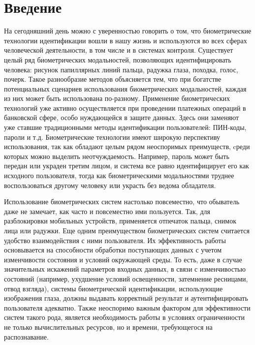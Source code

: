 \documentclass[12pt,a4paper]{article} %
\begin{document}
\newpage
\tableofcontents
 


\newpage
\section{Введение}

На сегодняшний день можно с уверенностью говорить о том, что биометрические технологии идентификации вошли в нашу жизнь и используются во всех сферах человеческой деятельности, в том числе и в системах контроля. Существует целый ряд биометрических модальностей, позволяющих идентифицировать человека: рисунок папиллярных линий пальца, радужка глаза, походка, голос, почерк. Такое разнообразие методов объясняется тем, что при богатстве потенциальных сценариев использования биометрических модальностей, каждая из них может быть использована по-разному. Применение биометрических технологий уже активно осуществляется при проведении платежных операций в банковской сфере, особо нуждающейся в защите данных. Здесь они заменяют уже ставшие традиционными методы идентификации пользователей: ПИН-коды, пароли и т.д. Биометрические технологии имеют широкую перспективу использования, так как обладают целым рядом неоспоримых преимуществ, cреди которых можно выделить неотчуждаемость. Например, пароль может быть передан или украден третим лицом, и система все равно идентифицирует его как исходного пользователя, тогда как биометрическими модальностями труднее воспользоваться другому человеку или украсть без ведома обладателя. 

Использование биометрических систем настолько повсеместно, что обыватель даже не замечает, как часто и повсеместно ими пользуется. Так, для разблокировки мобильных устройств, применяется отпечаток пальца, снимок лица или радужки. Еще одним преимуществом биометрических систем считается удобство взаимодействия с ними пользователя. Их эффективность работы основывается на способности обработки поступающих данных с учетом изменчивости состояния и условий окружающей среды. То есть, даже в случае значительных искажений параметров входных данных, в связи с изменчивостью состояний (например, ухудшение условий освещенности, затемнение ресницами, отвод взгляда), системы биометрической идентификации, использующие изображения глаза, должны выдавать корректный результат и аутентифицировать пользователя адекватно. Также неоспоримо важным фактором для эффективности систем такого рода, является необходимость работы в условиях ограниченности не только вычислительных ресурсов, но и времени, требующегося на распознавание. 
\end{document}
